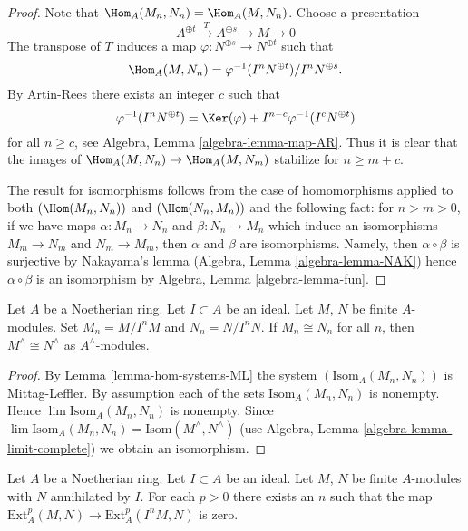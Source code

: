 \begin{proof}
Note that $\Hom_A(M_n, N_n) = \Hom_A(M, N_n)$. Choose a presentation
$$
A^{\oplus t} \xrightarrow{T} A^{\oplus s} \to M \to 0
$$
The transpose of $T$ induces a map $\varphi : N^{\oplus s} \to N^{\oplus t}$
such that
$$
\Hom_A(M, N_n) = \varphi^{-1}(I^nN^{\oplus t})/I^nN^{\oplus s}.
$$
By Artin-Rees there exists an integer $c$ such that
$$
\varphi^{-1}(I^nN^{\oplus t}) =
\Ker(\varphi) + I^{n - c}\varphi^{-1}(I^cN^{\oplus t})
$$
for all $n \geq c$, see Algebra, Lemma \ref{algebra-lemma-map-AR}. Thus it is
clear that the images of $\Hom_A(M, N_n) \to \Hom_A(M, N_m)$ stabilize for
$n \geq m + c$.

\medskip\noindent
The result for isomorphisms follows from the case of homomorphisms
applied to both $(\Hom(M_n, N_n))$ and $(\Hom(N_n, M_n))$
and the following fact: for $n > m > 0$, if we have maps
$\alpha : M_n \to N_n$ and $\beta : N_n \to M_n$ which
induce an isomorphisms $M_m \to N_m$ and $N_m \to M_m$, then
$\alpha$ and $\beta$ are isomorphisms. Namely, then $\alpha \circ \beta$
is surjective by Nakayama's lemma (Algebra, Lemma \ref{algebra-lemma-NAK})
hence $\alpha \circ \beta$ is an isomorphism by
Algebra, Lemma \ref{algebra-lemma-fun}.
\end{proof}

\begin{lemma}
\label{lemma-isomorphic-completions}
Let $A$ be a Noetherian ring. Let $I \subset A$ be an ideal. Let $M$, $N$ be
finite $A$-modules. Set $M_n = M/I^nM$ and $N_n = N/I^nN$. If
$M_n \cong N_n$ for all $n$, then $M^\wedge \cong N^\wedge$
as $A^\wedge$-modules.
\end{lemma}

\begin{proof}
By Lemma \ref{lemma-hom-systems-ML} the system $(\text{Isom}_A(M_n, N_n))$
is Mittag-Leffler. By assumption each of the sets
$\text{Isom}_A(M_n, N_n)$ is nonempty. Hence $\lim \text{Isom}_A(M_n, N_n)$
is nonempty. Since
$\lim \text{Isom}_A(M_n, N_n) = \text{Isom}(M^\wedge, N^\wedge)$
(use Algebra, Lemma \ref{algebra-lemma-limit-complete})
we obtain an isomorphism.
\end{proof}

\begin{lemma}
\label{lemma-ext-annihilated}
Let $A$ be a Noetherian ring. Let $I \subset A$ be an ideal.
Let $M$, $N$ be finite $A$-modules with $N$ annihilated by $I$.
For each $p > 0$ there exists an $n$ such that the map
$\text{Ext}_A^p(M, N) \to \text{Ext}_A^p(I^nM, N)$ is zero.
\end{lemma}

